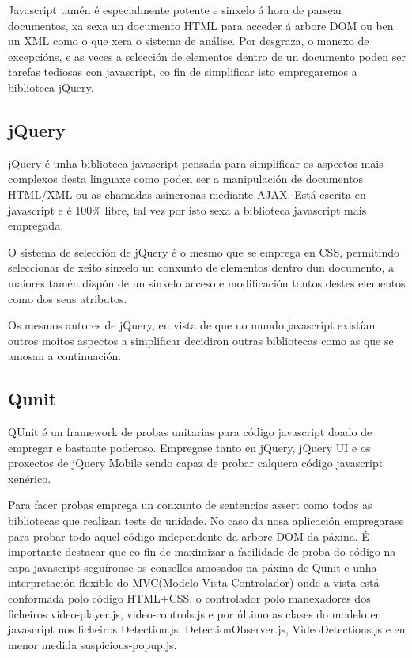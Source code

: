         Javascript tamén é especialmente potente e sinxelo á hora de parsear documentos, xa sexa
        un documento HTML para acceder á arbore DOM ou ben un XML como o que xera o sistema de 
        análise. Por desgraza, o manexo de excepcións, e as veces a selección de elementos dentro de un 
        documento poden ser tarefas tediosas con javascript, co fin de simplificar isto empregaremos
        a biblioteca jQuery.
            
        \subsection{jQuery}
        
            jQuery é unha biblioteca javascript pensada para simplificar os aspectos mais complexos desta 
            linguaxe como poden ser a manipulación de documentos HTML/XML ou as chamadas asíncronas 
            mediante AJAX. Está escrita en javascript e é 100\% libre, tal vez por isto sexa a biblioteca
            javascript mais empregada.
            
            O sistema de selección de jQuery é o mesmo que se emprega en CSS, permitindo seleccionar de 
            xeito sinxelo un conxunto de elementos dentro dun documento, a maiores tamén dispón de un 
            sinxelo acceso e modificación tantos destes elementos como dos seus atributos.
            
            Os mesmos autores de jQuery, en vista de que no mundo javascript existían outros moitos
            aspectos a simplificar decidiron outras bibliotecas como as que se amosan a continuación:
            
        \subsection{Qunit}
        
            QUnit é un framework de probas unitarias para código javascript doado de empregar e bastante
            poderoso. Empregase tanto en jQuery, jQuery UI e os proxectos de jQuery Mobile sendo capaz 
            de probar calquera código javascript xenérico.
            
            Para facer probas emprega un conxunto de sentencias assert como todas as bibliotecas que 
            realizan tests de unidade. No caso da nosa aplicación empregarase para probar todo aquel
            código independente da arbore DOM da páxina. É importante destacar que co fin de maximizar
            a facilidade de proba do código na capa javascript seguíronse os consellos amosados na páxina
            de Qunit\cite{QunitMakeItTesteable} e unha interpretación flexible do MVC(Modelo 
            Vista Controlador) onde a vista está conformada polo código HTML+CSS, o controlador polo 
            manexadores dos ficheiros video-player.js, video-controls.js e por último as clases do 
            modelo en javascript nos ficheiros Detection.js, DetectionObserver.js, VideoDetections.js e 
            en menor medida suspicious-popup.js.
        
